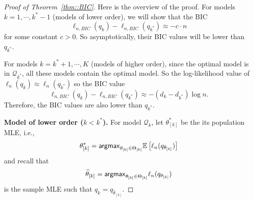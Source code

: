 \documentclass[aos, preprint]{imsart}
\theoremstyle{plain}
\theoremstyle{definition}
\let\hat\widehat
\newcommand{\E}{\mbox{$\mathbb{E}$}}
\begin{document}
\begin{appendix}

\begin{proof}[Proof of Theorem~\ref{thm::BIC}]

Here is the overview of the proof. 
For models $k=1,\cdots, k^*-1$ (models of lower order), we will show that 
the BIC 
$$
 \ell_{n, BIC}(q_k) -  \ell_{n, BIC}(q_{k^*}) \approx -c \cdot n
$$
for some constant $c>0$.
So asymptotically, their BIC values will be lower than $q_{k^*}$. 

For models $k = k^*+1,\cdots, K$ (models of higher order),
since the optimal model is in $\mathcal{Q}_{k^*}$, 
all these models contain the optimal model. 
So the log-likelihood value of $ \ell_{n}(q_k)\approx\ell_{n}(q_{k^*})$
so the BIC value 
$$
\ell_{n, BIC}(q_k) - \ell_{n, BIC}(q_{k^*}) \approx -(d_{k} - d_{k^*}) \log n.
$$
Therefore, the BIC values are also lower than $q_{k^*}$.

{\bf Model of lower order ($k<k^*$).}
For model $\mathcal{Q}_k$, 
let $\theta^*_{[k]}$ be the its population MLE, i.e.,
$$
\theta^*_{[k]} = {\sf argmax}_{\theta_{[k]}\in\Theta_{[k]}} \E\left[ \ell_{n}(q_{\theta_{[k]}})\right]
$$
and recall that 
$$
\hat \theta_{[k]} = {\sf argmax}_{\theta_{[k]}\in\Theta_{[k]}}  \ell_{n}(q_{\theta_{[k]}})
$$
is the sample MLE such that $q_k = q_{\hat \theta_{[k]}}$.


\end{proof}
\end{appendix}
\end{document}
